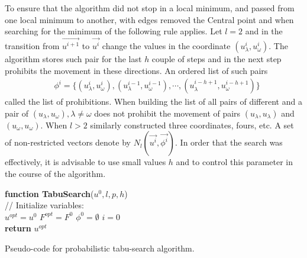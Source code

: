 \documentclass[]{TAACpaper}
\begin{document}
To ensure that the algorithm did not stop in a local minimum, and passed from one local minimum to another, with edges removed the Central point and when searching for the minimum of the following rule applies. Let $l=2$ and in the transition from $\vec{u^{i+1}}$ to $\vec{u^i}$ change the values in the coordinate $(u_\lambda^{i}, u_\omega^{i})$. The algorithm stores such pair for the last $h$ couple of steps and in the next step prohibits the movement in these directions. An ordered list of such pairs
\begin{align} 
& \phi^i=\{(u_\lambda^{i},u_\omega^{i}),(u_\lambda^{i-1},u_\omega^{i-1}),\cdots,(u_\lambda^{i-h+1},u_\omega^{i-h+1}) \} 
\end{align}	
called the list of prohibitions. When building the list of all pairs of different and a pair of $(u_\lambda,u_\omega),\lambda \ne \omega$ does not prohibit the movement of pairs $(u_\lambda,u_\lambda)$ and $(u_\omega,u_\omega)$. When $l>2$ similarly constructed three coordinates, fours, etc. A set of non-restricted vectors denote by $N_l(\vec{u^i},\vec{\phi^i})$. In order that the search was effectively, it is advisable to use small values $h$ and to control this parameter in the course of the algorithm.

\begin{algorithm}[H]
	\textbf{function TabuSearch}($u^0,l,p,h$) \\
	// Initialize variables:	\\
	$u^{opt} = u^0$
	$F^{opt} = F^0$
	$\phi^{0} =  \emptyset$
	$i=0$ \\
	\textbf{return} $u^{opt}$
	
\caption{Pseudo-code for probabilistic tabu-search algorithm.}
\label{alg:TabuSearch}
\end{algorithm}
\end{document}
